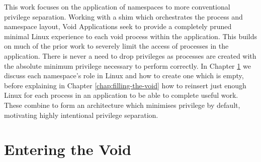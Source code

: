 \documentclass[12pt,a4paper,twoside]{report}
\begin{document}
This work focuses on the application of namespaces to more conventional privilege separation. Working with a shim which orchestrates the process and namespace layout, Void Applications seek to provide a completely pruned minimal Linux experience to each void process within the application. This builds on much of the prior work to severely limit the access of processes in the application. There is never a need to drop privileges as processes are created with the absolute minimum privilege necessary to perform correctly. In Chapter \ref{chap:entering-the-void} we discuss each namespace's role in Linux and how to create one which is empty, before explaining in Chapter \ref{chap:filling-the-void} how to reinsert just enough Linux for each process in an application to be able to complete useful work. These combine to form an architecture which minimises privilege by default, motivating highly intentional privilege separation.


\chapter{Entering the Void}
\label{chap:entering-the-void}
\end{document}
